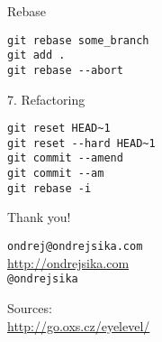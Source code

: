 \documentclass{beamer}
\begin{document}
\begin{frame}[fragile]

    {\LARGE Rebase}\\

    \begin{verbatim}
git rebase some_branch
git add .
git rebase --abort
    \end{verbatim}

\end{frame}

\begin{frame}[fragile]

    {\LARGE 7. Refactoring}\\

    \begin{verbatim}
git reset HEAD~1
git reset --hard HEAD~1
git commit --amend
git commit --am
git rebase -i
    \end{verbatim}

\end{frame}

\begin{frame}

    {\LARGE Thank you!}\\

    \vspace{1cm}

    \texttt{ondrej@ondrejsika.com}\\
    \url{http://ondrejsika.com}\\
    \texttt{@ondrejsika}\\

    \vspace{1cm}

    Sources:\\
    \url{http://go.oxs.cz/eyelevel/}
\end{frame}
\end{document}
